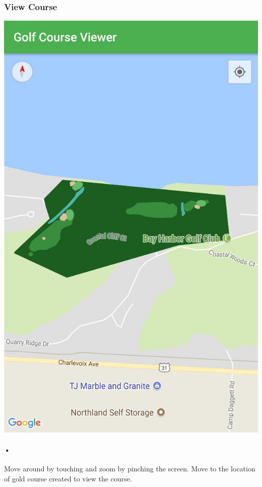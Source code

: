 \documentclass{article}
\begin{document}
	\subsubsection{View Course}
	    \includegraphics[scale=0.2]{mobilemap.jpg}
	
	\paragraph{•}
	Move around by touching and zoom by pinching the screen. Move to the location of gold course created to view the course.
	
	
\end{document}
